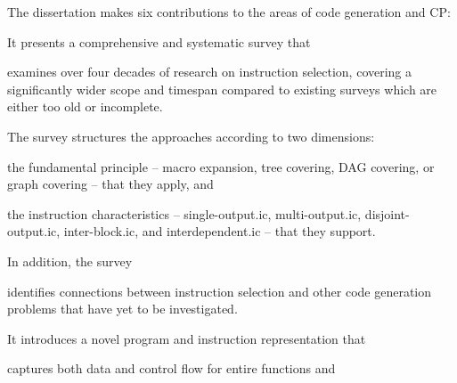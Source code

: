 The dissertation makes six contributions to the areas of \gls{code generation}
and \glsdesc{CP}:
%
\begin{contributions}
  \item {}
    It presents a comprehensive and systematic survey that
    \begin{contributions}
      \item {}
        examines over four decades of research on \gls{instruction selection},
        covering a significantly wider scope and timespan compared to existing
        surveys \cite{Cattell:1977, GanapathiEtAl:1982:Survey, Lunell:1983,
          Leupers:2000:Survey, BoulytchevLomov:2001} which are either too old
        or incomplete.
    \end{contributions}
    The survey structures the approaches according to two dimensions:
    \begin{contributions}[resume]
      \item {}
        the fundamental \gls{principle} -- \gls{macro expansion}, \gls{tree
          covering}, \gls{DAG covering}, or \gls{graph covering} -- that they
        apply, and
    \end{contributions}
    \begin{contributions}[resume]
      \item {}
        the \glspl{instruction characteristic} -- \gls{single-output.ic},
        \gls{multi-output.ic}, \gls{disjoint-output.ic}, \gls{inter-block.ic},
        and \gls{interdependent.ic} -- that they support.
    \end{contributions}
    In addition, the survey
    \begin{contributions}[resume]
      \item {}
        identifies connections between \gls{instruction selection} and other
        \gls{code generation} problems that have yet to be investigated.
    \end{contributions}
  \item {}
    It introduces a novel \gls{program} and \gls{instruction} representation
    that
    \begin{contributions}
      \item {}
        captures both data and control flow for entire \glspl{function} and

\end{contributions}
\end{contributions}
